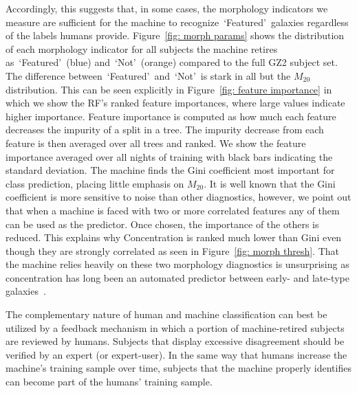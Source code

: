 \documentclass[twocolumn,  trackchanges, ]{aastex6}%
\newcommand{\M}[1]{$M_{\mathrm{#1}}$}
\newcommand{\feat}{`Featured'}
\newcommand{\notfeat}{`Not'}
\begin{document}
Accordingly, this suggests that, in some cases, the morphology indicators we measure are 
sufficient for the machine to recognize~\feat~galaxies regardless of the labels humans provide. 
Figure~\ref{fig: morph params} shows the distribution of each 
morphology indicator for all subjects the machine retires as~\feat~(blue) 
and~\notfeat~(orange) compared to the full GZ2 subject set. 
The difference between~\feat~and~\notfeat~is stark in all but the \M{20} distribution. 
This can be seen explicitly in Figure~\ref{fig:  feature importance} in which
we show the RF's ranked feature importances, where large values indicate higher importance. 
Feature importance is computed as how much each feature decreases the impurity 
of a split in a tree. The impurity decrease from each feature is then averaged over
all trees and ranked. 
We show the feature importance averaged over all nights of training with 
black bars indicating the standard deviation. The machine finds the Gini coefficient 
most important for class prediction, placing little emphasis on \M{20}. 
It is well known that the Gini coefficient is more sensitive to noise than other diagnostics, 
however, we point out that when a machine is faced with two or more correlated features 
any of them can be used as the predictor. Once chosen, the importance of the others is reduced. 
This explains why Concentration is ranked much lower than Gini even though they 
are strongly correlated as seen in Figure~\ref{fig: morph thresh}. 
That the machine relies heavily on these two morphology diagnostics is unsurprising as
concentration has long been an automated predictor between early- and late-type galaxies~\citep{Abraham1994, Abraham1996, Shen2003}.


The complementary nature of human and machine classification can 
best be utilized by a feedback mechanism in which a portion of machine-retired
subjects are reviewed by humans. Subjects that display excessive disagreement
should be verified by an expert (or expert-user).  In the same way that 
humans increase the machine's training sample over time, subjects that the
machine properly identifies can become part of the humans' training sample. 



\end{document}
